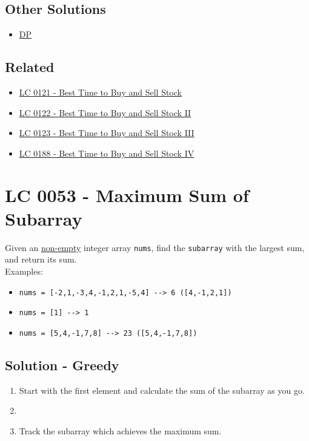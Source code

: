 \subsection*{Other Solutions}
\begin{itemize}
\item \hyperref[solution:lc0122_dp]{DP}
\end{itemize}

\subsection*{Related}
\begin{itemize}
	\item \hyperref[lc0121]{LC 0121 - Best Time to Buy and Sell Stock}
	\item \hyperref[lc0122]{LC 0122 - Best Time to Buy and Sell Stock II}
	\item \hyperref[lc0123]{LC 0123 - Best Time to Buy and Sell Stock III}
	\item \hyperref[lc0188]{LC 0188 - Best Time to Buy and Sell Stock IV}
\end{itemize}

\section{LC 0053 - Maximum Sum of Subarray}
Given an \ul{non-empty} integer array {\colorbox{CodeBackground}{\lstinline|nums|}}, find the {\colorbox{CodeBackground}{\lstinline|subarray|}} with the largest sum, and return its sum.\\

Examples:
\begin{itemize}
	\item {\colorbox{CodeBackground}{\lstinline|nums = [-2,1,-3,4,-1,2,1,-5,4] --> 6 ([4,-1,2,1])|}}
	\item {\colorbox{CodeBackground}{\lstinline|nums = [1] --> 1|}}
	\item {\colorbox{CodeBackground}{\lstinline|nums = [5,4,-1,7,8] --> 23 ([5,4,-1,7,8])|}}
\end{itemize}

\subsection*{Solution - Greedy}\label{solution:lc0053_greedy}
\begin{enumerate}
\item Start with the first element and calculate the sum of the subarray as you go.
\item {\color{magenta}{If the sum of the current subarray is negative, we start a new subarray from the next element.}}
\item Track the subarray which achieves the maximum sum.
\end{enumerate}


